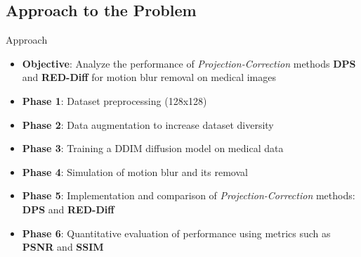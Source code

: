 \subsection{Approach to the Problem}
\begin{frame}{Approach}
  \begin{itemize}
    \item \textbf{Objective}: Analyze the performance of \textit{Projection-Correction} methods \textbf{DPS} and \textbf{RED-Diff} for motion blur removal on medical images
    \item \textbf{Phase 1}: Dataset preprocessing (128x128)
    \item \textbf{Phase 2}: Data augmentation to increase dataset diversity
    \item \textbf{Phase 3}: Training a DDIM diffusion model on medical data
    \item \textbf{Phase 4}: Simulation of motion blur and its removal
    \item \textbf{Phase 5}: Implementation and comparison of \textit{Projection-Correction} methods: \textbf{DPS} and \textbf{RED-Diff}
    \item \textbf{Phase 6}: Quantitative evaluation of performance using metrics such as \textbf{PSNR} and \textbf{SSIM}
  \end{itemize}
\end{frame}